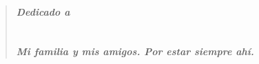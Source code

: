 \newpage
\thispagestyle{empty}

~

\cleardoublepage
{}
\thispagestyle{empty}

\vspace{6cm}

\begin{quotation}
\noindent \begin{center}
\textbf{\emph{\Large Dedicado a}}\textbf{\emph{\large }}\\
\textbf{\emph{\large }}\\
\textbf{\emph{\large }}\\
\textbf{\emph{\large Mi familia y mis amigos. Por estar siempre ahí.}}
\par\end{center}{\large \par}
\end{quotation}

\newpage
\thispagestyle{empty}

~\newpage
\thispagestyle{empty}


